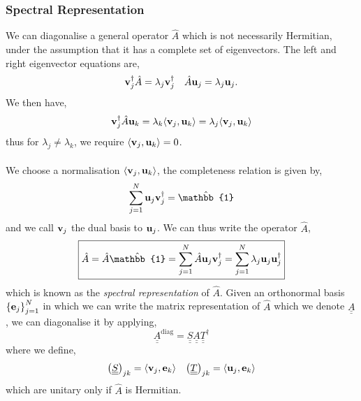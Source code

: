 \documentclass{book}
\def\innerproduct#1#2{\langle#1,#2\rangle}
\def\doubleunderline#1{\underline{\underline{#1}}}
\begin{document}
\subsubsection{Spectral Representation}
We can diagonalise a general operator $\hat{A}$ which is not necessarily Hermitian, under the assumption that it has a complete set of eigenvectors. The left and right eigenvector equations are,
\begin{align}
	\vb{v}_j^{\dag}\hat{A} = \lambda_j\vb{v}_j^{\dag} && \hat{A}\vb{u}_j = \lambda_j\vb{u}_j.
\end{align}
We then have,
\begin{equation}
	\vb{v}_j^{\dag}\hat{A}\vb{u}_k = \lambda_k\innerproduct{\vb{v}_j}{\vb{u}_k} = \lambda_j\innerproduct{\vb{v}_j}{\vb{u}_k}
\end{equation}
thus for $\lambda_j \neq \lambda_k$, we require $\innerproduct{\vb{v}_j}{\vb{u}_k} = 0$.
\\\\
We choose a normalisation $\innerproduct{\vb{v}_j}{\vb{u}_k}$, the completeness relation is given by,
\begin{equation}
	\sum_{j=1}^N \vb{u}_j\vb{v}_j^{\dag} = \hat{\mathbb{1}}
\end{equation}
and we call $\vb{v}_j$ the dual basis to $\vb{u}_j$. We can thus write the operator $\hat{A}$,
\begin{equation}
	\boxed{\hat{A} = \hat{A}\hat{\mathbb{1}} = \sum_{j=1}^N\hat{A}\vb{u}_j\vb{v}_j^{\dag} = \sum_{j=1}^N\lambda_j\vb{u}_j\vb{u}_j^{\dag}}
\end{equation}
which is known as the \textit{spectral representation} of $\hat{A}$. Given an orthonormal basis $\left\{\vb{e}_j\right\}_{j=1}^N$ in which we can write the matrix representation of $\hat{A}$ which we denote $\doubleunderline{A}$, we can diagonalise it by applying,
\begin{equation}
	\doubleunderline{A}^{\text{diag}} = \doubleunderline{S} \doubleunderline{A} \doubleunderline{T}^{\dag}
\end{equation}
where we define,
\begin{align}
	\left(\doubleunderline{S}\right)_{jk} = \innerproduct{\vb{v}_j}{ \vb{e}_k} && \left(\doubleunderline{T}\right)_{jk} = \innerproduct{\vb{u}_j}{\vb{e}_k}
\end{align}
which are unitary only if $\hat{A}$ is Hermitian.
\end{document}
